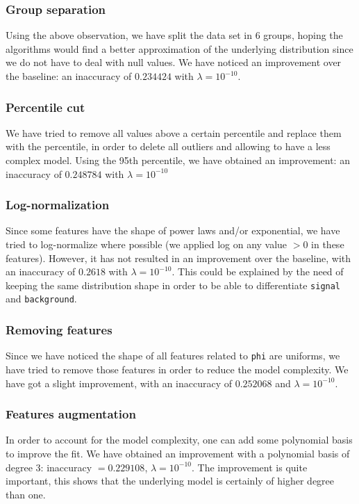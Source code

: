 \documentclass[10pt,conference,compsocconf]{IEEEtran}
\begin{document}
\subsubsection{Group separation}
Using the above observation, we have split the data set in $6$ groups, hoping
the algorithms would find a better approximation of the underlying distribution
since we do not have to deal with null values. We have noticed an
improvement over the baseline: an inaccuracy of $0.234424$ with $\lambda =
10^{-10}$.

\subsubsection{Percentile cut}
We have tried to remove all values above a certain percentile and replace them with
the percentile, in order to delete all outliers and allowing to have a less
complex model. Using the 95th percentile, we have obtained an improvement: an
inaccuracy of $0.248784$ with $\lambda = 10^{-10}$

\subsubsection{Log-normalization}
Since some features have the shape of power laws and/or exponential, we have
tried to log-normalize where possible (we applied log on any value $>0$ in these
features). However, it has not resulted in an improvement over the baseline, with
an inaccuracy of $0.2618$ with $\lambda = 10^{-10}$. This could be explained by
the need of keeping the same distribution shape in order to be able to
differentiate \texttt{signal} and \texttt{background}.

\subsubsection{Removing features}
Since we have noticed the shape of all features related to \texttt{phi} are
uniforms, we have tried to remove those features in order to reduce the model
complexity. We have got a slight improvement, with an inaccuracy of $0.252068$
and $\lambda = 10^{-10}$.

\subsubsection{Features augmentation}
In order to account for the model complexity, one can add some polynomial basis
to improve the fit. We have obtained an improvement with a polynomial basis of
degree $3$: inaccuracy $= 0.229108$, $\lambda = 10^{-10}$. The improvement is
quite important, this shows that the underlying model is certainly of higher
degree than one.
\end{document}
